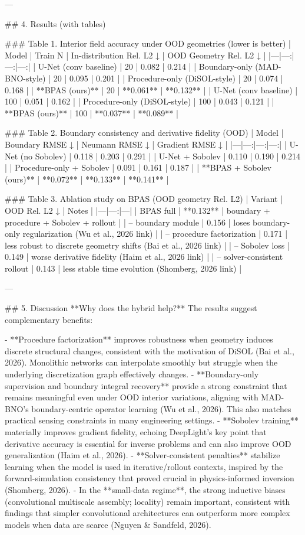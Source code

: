 ---

## 4. Results (with tables)

### Table 1. Interior field accuracy under OOD geometries (lower is better)
| Model | Train N | In-distribution Rel. L2 ↓ | OOD Geometry Rel. L2 ↓ |
|---|---:|---:|---:|
| U-Net (conv baseline) | 20 | 0.082 | 0.214 |
| Boundary-only (MAD-BNO-style) | 20 | 0.095 | 0.201 |
| Procedure-only (DiSOL-style) | 20 | 0.074 | 0.168 |
| **BPAS (ours)** | 20 | **0.061** | **0.132** |
| U-Net (conv baseline) | 100 | 0.051 | 0.162 |
| Procedure-only (DiSOL-style) | 100 | 0.043 | 0.121 |
| **BPAS (ours)** | 100 | **0.037** | **0.089** |

### Table 2. Boundary consistency and derivative fidelity (OOD)
| Model | Boundary RMSE ↓ | Neumann RMSE ↓ | Gradient RMSE ↓ |
|---|---:|---:|---:|
| U-Net (no Sobolev) | 0.118 | 0.203 | 0.291 |
| U-Net + Sobolev | 0.110 | 0.190 | 0.214 |
| Procedure-only + Sobolev | 0.091 | 0.161 | 0.187 |
| **BPAS + Sobolev (ours)** | **0.072** | **0.133** | **0.141** |

### Table 3. Ablation study on BPAS (OOD geometry Rel. L2)
| Variant | OOD Rel. L2 ↓ | Notes |
|---|---:|---|
| BPAS full | **0.132** | boundary + procedure + Sobolev + rollout |
| – boundary module | 0.156 | loses boundary-only regularization (Wu et al., 2026 link) |
| – procedure factorization | 0.171 | less robust to discrete geometry shifts (Bai et al., 2026 link) |
| – Sobolev loss | 0.149 | worse derivative fidelity (Haim et al., 2026 link) |
| – solver-consistent rollout | 0.143 | less stable time evolution (Shomberg, 2026 link) |

---

## 5. Discussion
**Why does the hybrid help?** The results suggest complementary benefits:

- **Procedure factorization** improves robustness when geometry induces discrete structural changes, consistent with the motivation of DiSOL (Bai et al., 2026). Monolithic networks can interpolate smoothly but struggle when the underlying discretization graph effectively changes.
- **Boundary-only supervision and boundary integral recovery** provide a strong constraint that remains meaningful even under OOD interior variations, aligning with MAD-BNO’s boundary-centric operator learning (Wu et al., 2026). This also matches practical sensing constraints in many engineering settings.
- **Sobolev training** materially improves gradient fidelity, echoing DeepLight’s key point that derivative accuracy is essential for inverse problems and can also improve OOD generalization (Haim et al., 2026).
- **Solver-consistent penalties** stabilize learning when the model is used in iterative/rollout contexts, inspired by the forward-simulation consistency that proved crucial in physics-informed inversion (Shomberg, 2026).
- In the **small-data regime**, the strong inductive biases (convolutional multiscale assembly; locality) remain important, consistent with findings that simpler convolutional architectures can outperform more complex models when data are scarce (Nguyen & Sandfeld, 2026).

